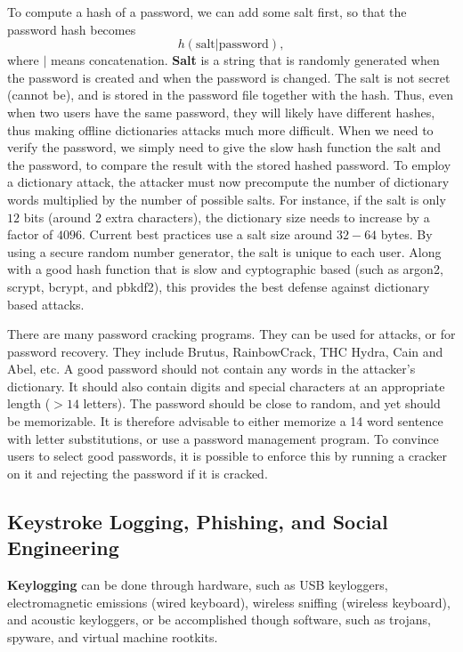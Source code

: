 \documentclass[11pt]{article}
\theoremstyle{plain} %
\theoremstyle{definition}
\theoremstyle{example}
\theoremstyle{remark}
\begin{document}
To compute a hash of a password, we can add some salt first, so that the password hash becomes
$$ h(\text{salt} |\text{password}),$$
where $|$ means concatenation. \textbf{Salt} is a string that is randomly generated when the password is created and when the password is changed. The salt is not secret (cannot be), and is stored in the password file together with the hash. Thus, even when two users have the same password, they will likely have different hashes, thus making offline dictionaries attacks much more difficult. When we need to verify the password, we simply need to give the slow hash function the salt and the password, to compare the result with the stored hashed password. To employ a dictionary attack, the attacker must now precompute the number of dictionary words multiplied by the number of possible salts. For instance, if the salt is only $12$ bits (around 2 extra characters), the dictionary size needs to increase by a factor of $4096$. Current best practices use a salt size around $32-64$ bytes. By using a secure random number generator, the salt is unique to each user. Along with a good hash function that is slow and cyptographic based (such as argon2, scrypt, bcrypt, and pbkdf2), this provides the best defense against dictionary based attacks. 

There are many password cracking programs. They can be used for attacks, or for password recovery. They include Brutus, RainbowCrack, THC Hydra, Cain and Abel, etc. A good password should not contain any words in the attacker's dictionary. It should also contain digits and special characters at an appropriate length ($> 14$ letters). The password should be close to random, and yet should be memorizable. It is therefore advisable to either memorize a 14 word sentence with letter substitutions, or use a password management program. To convince users 
to select good passwords, it is possible to enforce this by running a cracker on it and rejecting the password if it is cracked. 

\subsection{Keystroke Logging, Phishing, and Social Engineering}

\textbf{Keylogging} can be done through hardware, such as USB keyloggers, electromagnetic emissions (wired keyboard), wireless sniffing (wireless keyboard), and acoustic keyloggers, or be accomplished though software, such as trojans, spyware, and virtual machine rootkits. 
\end{document}
